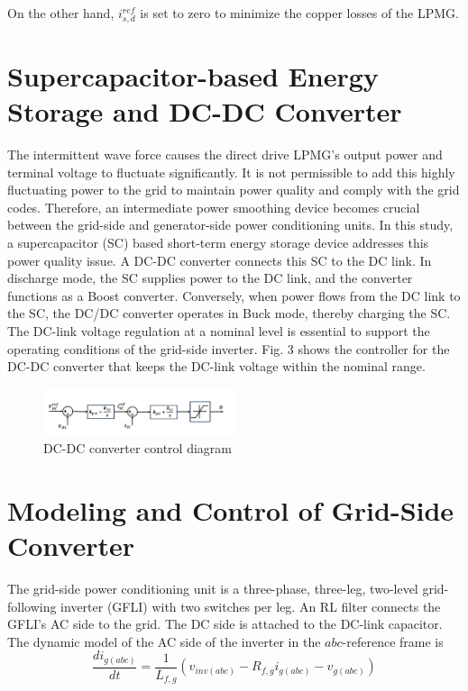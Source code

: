 \documentclass[conference]{IEEEtran}
\begin{document}
On the other hand, $i_{s,d}^{ref}$ is set to zero to minimize the copper losses of the LPMG. 

\section{Supercapacitor-based Energy Storage and DC-DC Converter}
The intermittent wave force causes the direct drive LPMG's output power and terminal voltage to fluctuate significantly. It is not permissible to add this highly fluctuating power to the grid to maintain power quality and comply with the grid codes. Therefore, an intermediate power smoothing device becomes crucial between the grid-side and generator-side power conditioning units. In this study, a supercapacitor (SC) based short-term energy storage device addresses this power quality issue.
A DC-DC converter connects this SC to the DC link. In discharge mode, the SC supplies power to the DC link, and the converter functions as a Boost converter. Conversely, when power flows from the DC link to the SC, the DC/DC converter operates in Buck mode, thereby charging the SC. 
The DC-link voltage regulation at a nominal level is essential to support the operating conditions of the grid-side inverter. Fig. 3 shows the controller for the DC-DC converter that keeps the DC-link voltage within the nominal range.
\vspace{-1.5em}
\begin{figure}[hp]
\centerline{\includegraphics[width=0.5\textwidth]{Figs/5_3_1/dc dc con.png}}
\vspace{-1em}
\caption{DC-DC converter control diagram}
\label{fig1}
\end{figure}

\section{Modeling and Control of Grid-Side Converter}
The grid-side power conditioning unit is a three-phase, three-leg, two-level grid-following inverter (GFLI) with two switches per leg. An RL filter connects the GFLI's AC side to the grid. The DC side is attached to the DC-link capacitor. The dynamic model of the AC side of the inverter in the $abc$-reference frame is
\begin{equation}
\frac{di_{g(abc)}}{dt} = \frac{1}{L_{f,g}} \left( v_{inv(abc)} - R_{f,g} i_{g(abc)} - v_{g(abc)} \right)
\end{equation}
\end{document}

